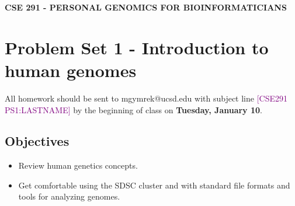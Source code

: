 \documentclass[12pt]{article}
\begin{document}
\textbf{CSE 291 - PERSONAL GENOMICS FOR BIOINFORMATICIANS}

\section*{Problem Set 1 - Introduction to human genomes}

All homework should be sent to mgymrek@ucsd.edu with subject line \textcolor{purple}{[CSE291 PS1:LASTNAME]} by the beginning of class on \textbf{Tuesday, January 10}. 

\subsection*{Objectives}
\begin{itemize}
\item Review human genetics concepts.
\item Get comfortable using the SDSC cluster and with standard file formats and tools for analyzing genomes.
\end{itemize}
\end{document}
